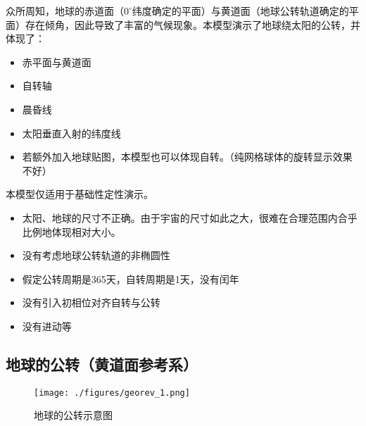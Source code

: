 

众所周知，地球的赤道面（$0 ^\circ$纬度确定的平面）与黄道面（地球公转轨道确定的平面）存在倾角，因此导致了丰富的气候现象。本模型演示了地球绕太阳的公转，并体现了：
\begin{itemize}
\item 赤平面与黄道面
\item 自转轴
\item 晨昏线
\item 太阳垂直入射的纬度线
\item 若额外加入地球贴图，本模型也可以体现自转。（纯网格球体的旋转显示效果不好）
\end{itemize}

本模型仅适用于基础性定性演示。
\begin{itemize}
\item 太阳、地球的尺寸不正确。由于宇宙的尺寸如此之大，很难在合理范围内合乎比例地体现相对大小。
\item 没有考虑地球公转轨道的非椭圆性
\item 假定公转周期是365天，自转周期是1天，没有闰年
\item 没有引入初相位对齐自转与公转
\item 没有进动等
\end{itemize}

\subsection{地球的公转（黄道面参考系）}
\begin{figure}[ht]
\centering
\texttt{[image: ./figures/georev\_1.png]}
\caption{地球的公转示意图} \label{georev_fig1}
\end{figure}

